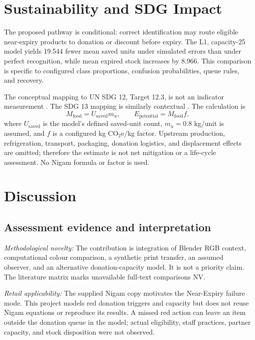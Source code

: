 \documentclass[journal]{IEEEtran}
\begin{document}
\section{Sustainability and SDG Impact}
The proposed pathway is conditional: correct identification may route eligible near-expiry products to donation or discount before expiry. The L1, capacity-25 model yields 19.544 fewer mean saved units under simulated errors than under perfect recognition, while mean expired stock increases by 8.966. This comparison is specific to configured class proportions, confusion probabilities, queue rules, and recovery.

The conceptual mapping to UN SDG 12, Target 12.3, is not an indicator measurement \cite{sdg12}. The SDG 13 mapping is similarly contextual \cite{sdg13}. The calculation is
\begin{equation}
M_{\text{food}}=U_{\text{saved}}m_u,\qquad
E_{\text{potential}}=M_{\text{food}}f,
\end{equation}
where $U_{\text{saved}}$ is the model's defined saved-unit count, $m_u=0.8$ kg/unit is assumed, and $f$ is a configured kg CO$_2$e/kg factor. Upstream production, refrigeration, transport, packaging, donation logistics, and displacement effects are omitted; therefore the estimate is not net mitigation or a life-cycle assessment. No Nigam formula or factor is used.

\section{Discussion}
\subsection{Assessment evidence and interpretation}
\textit{Methodological novelty:} The contribution is integration of Blender RGB context, computational colour comparison, a synthetic print transfer, an assumed observer, and an alternative donation-capacity model. It is not a priority claim. The literature matrix marks unavailable full-text comparisons NV.

\textit{Retail applicability:} The supplied Nigam copy motivates the Near-Expiry failure mode. This project models red donation triggers and capacity but does not reuse Nigam equations or reproduce its results. A missed red action can leave an item outside the donation queue in the model; actual eligibility, staff practices, partner capacity, and stock disposition were not observed.
\end{document}
